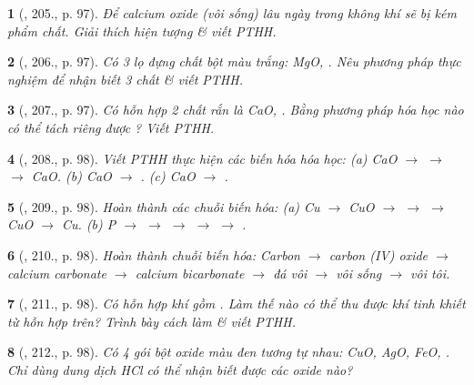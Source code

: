 \documentclass{article}
\newtheorem{baitoan}{}
\begin{document}
\begin{baitoan}[\cite{Nguyen_Buu_Can_500_BT_Hoa_Hoc_THCS}, 205., p. 97]
	Để calcium oxide (vôi sống) lâu ngày trong không khí sẽ bị kém phẩm chất. Giải thích hiện tượng \& viết {\rm PTHH}.
\end{baitoan}

\begin{baitoan}[\cite{Nguyen_Buu_Can_500_BT_Hoa_Hoc_THCS}, 206., p. 97]
	Có 3 lọ đựng chất bột màu trắng: {\rm MgO, }. Nêu phương pháp thực nghiệm để nhận biết 3 chất \& viết {\rm PTHH}.
\end{baitoan}

\begin{baitoan}[\cite{Nguyen_Buu_Can_500_BT_Hoa_Hoc_THCS}, 207., p. 97]
	Có hỗn hợp 2 chất rắn là {\rm CaO, }. Bằng phương pháp hóa học nào có thể tách riêng được {\rm{}}? Viết {\rm PTHH}.
\end{baitoan}

\begin{baitoan}[\cite{Nguyen_Buu_Can_500_BT_Hoa_Hoc_THCS}, 208., p. 98]
	Viết {\rm PTHH} thực hiện các biến hóa hóa học: {\rm(a) CaO $\to$  $\to$  $\to$ CaO. (b) CaO $\to$ . (c) CaO $\to$ }.
\end{baitoan}

\begin{baitoan}[\cite{Nguyen_Buu_Can_500_BT_Hoa_Hoc_THCS}, 209., p. 98]
	Hoàn thành các chuỗi biến hóa: {\rm(a) Cu $\to$ CuO $\to$  $\to$  $\to$ CuO $\to$ Cu. (b) P $\to$  $\to$  $\to$  $\to$  $\to$ }.
\end{baitoan}

\begin{baitoan}[\cite{Nguyen_Buu_Can_500_BT_Hoa_Hoc_THCS}, 210., p. 98]
	Hoàn thành chuỗi biến hóa: Carbon $\to$ carbon (IV) oxide $\to$ calcium carbonate $\to$ calcium bicarbonate $\to$ đá vôi $\to$ vôi sống $\to$ vôi tôi.
\end{baitoan}

\begin{baitoan}[\cite{Nguyen_Buu_Can_500_BT_Hoa_Hoc_THCS}, 211., p. 98]
	Có hỗn hợp khí gồm {\rm{}}. Làm thế nào có thể thu được khí {\rm{}} tinh khiết từ hỗn hợp trên? Trình bày cách làm \& viết {\rm PTHH}.
\end{baitoan}

\begin{baitoan}[\cite{Nguyen_Buu_Can_500_BT_Hoa_Hoc_THCS}, 212., p. 98]
	Có 4 gói bột oxide màu đen tương tự nhau: {\rm CuO, AgO, FeO, }. Chỉ dùng dung dịch {\rm HCl} có thể nhận biết được các oxide nào?
\end{baitoan}
\end{document}
